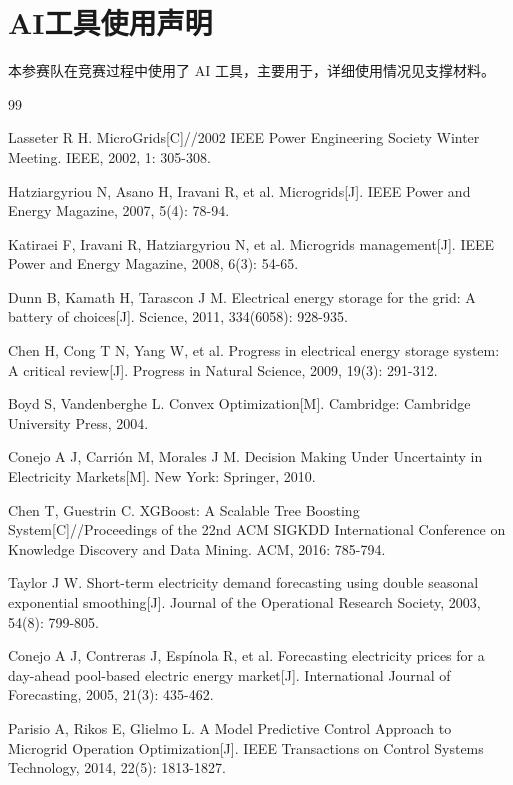 






\section*{AI工具使用声明}
本参赛队在竞赛过程中使用了 AI 工具，主要用于，详细使用情况见支撑材料。\par

\begin{thebibliography}{99}

Lasseter R H. MicroGrids[C]//2002 IEEE Power Engineering Society Winter Meeting. IEEE, 2002, 1: 305-308.

Hatziargyriou N, Asano H, Iravani R, et al. Microgrids[J]. IEEE Power and Energy Magazine, 2007, 5(4): 78-94.

Katiraei F, Iravani R, Hatziargyriou N, et al. Microgrids management[J]. IEEE Power and Energy Magazine, 2008, 6(3): 54-65.

Dunn B, Kamath H, Tarascon J M. Electrical energy storage for the grid: A battery of choices[J]. Science, 2011, 334(6058): 928-935.

Chen H, Cong T N, Yang W, et al. Progress in electrical energy storage system: A critical review[J]. Progress in Natural Science, 2009, 19(3): 291-312.

Boyd S, Vandenberghe L. Convex Optimization[M]. Cambridge: Cambridge University Press, 2004.

Conejo A J, Carrión M, Morales J M. Decision Making Under Uncertainty in Electricity Markets[M]. New York: Springer, 2010.

Chen T, Guestrin C. XGBoost: A Scalable Tree Boosting System[C]//Proceedings of the 22nd ACM SIGKDD International Conference on Knowledge Discovery and Data Mining. ACM, 2016: 785-794.

Taylor J W. Short-term electricity demand forecasting using double seasonal exponential smoothing[J]. Journal of the Operational Research Society, 2003, 54(8): 799-805.

Conejo A J, Contreras J, Espínola R, et al. Forecasting electricity prices for a day-ahead pool-based electric energy market[J]. International Journal of Forecasting, 2005, 21(3): 435-462.

Parisio A, Rikos E, Glielmo L. A Model Predictive Control Approach to Microgrid Operation Optimization[J]. IEEE Transactions on Control Systems Technology, 2014, 22(5): 1813-1827.


\end{thebibliography}

